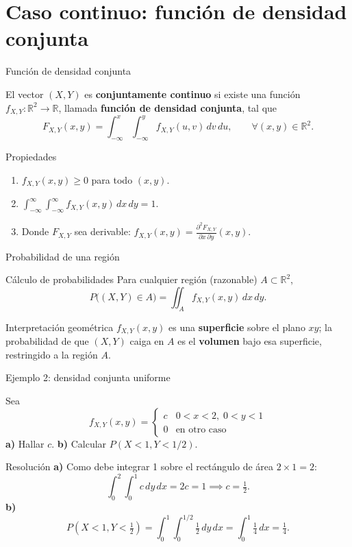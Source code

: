 \documentclass[aspectratio=169,11pt]{beamer}
\begin{document}
\section{Caso continuo: función de densidad conjunta}

\begin{frame}{Función de densidad conjunta}
\begin{definition}
El vector $(X,Y)$ es \textbf{conjuntamente continuo} si existe una función $f_{X,Y}: \mathbb{R}^2 \to \mathbb{R}$, llamada \textbf{función de densidad conjunta}, tal que
\[
F_{X,Y}(x,y) = \int_{-\infty}^{x} \int_{-\infty}^{y} f_{X,Y}(u,v) \, dv \, du, \qquad \forall (x,y) \in \mathbb{R}^2.
\]
\end{definition}
\begin{block}{Propiedades}
\begin{enumerate}
\item $f_{X,Y}(x,y) \ge 0$ para todo $(x,y)$.
\item $\displaystyle\int_{-\infty}^{\infty}\int_{-\infty}^{\infty} f_{X,Y}(x,y)\, dx\, dy = 1$.
\item Donde $F_{X,Y}$ sea derivable: $\displaystyle f_{X,Y}(x,y) = \frac{\partial^2 F_{X,Y}}{\partial x \, \partial y}(x,y)$.
\end{enumerate}
\end{block}
\end{frame}

\begin{frame}{Probabilidad de una región}
\begin{block}{Cálculo de probabilidades}
Para cualquier región (razonable) $A \subset \mathbb{R}^2$,
\[
P\big((X,Y) \in A\big) = \iint_{A} f_{X,Y}(x,y)\, dx\, dy.
\]
\end{block}
\pause
\begin{alertblock}{Interpretación geométrica}
$f_{X,Y}(x,y)$ es una \textbf{superficie} sobre el plano $xy$; la probabilidad de que $(X,Y)$ caiga en $A$ es el \textbf{volumen} bajo esa superficie, restringido a la región $A$.
\end{alertblock}
\end{frame}

\begin{frame}{Ejemplo 2: densidad conjunta uniforme}
\begin{example}
Sea
\[
f_{X,Y}(x,y) = \begin{cases} c & 0 < x < 2, \; 0 < y < 1 \\ 0 & \text{en otro caso} \end{cases}
\]
\textbf{a)} Hallar $c$. \quad \textbf{b)} Calcular $P(X < 1, Y < 1/2)$.
\end{example}
\pause
\begin{block}{Resolución}
\textbf{a)} Como debe integrar 1 sobre el rectángulo de área $2\times 1 = 2$:
\[
\int_0^2 \int_0^1 c \, dy\, dx = 2c = 1 \implies c = \tfrac{1}{2}.
\]
\textbf{b)}
\[
P(X<1, Y<\tfrac12) = \int_0^1 \int_0^{1/2} \tfrac12 \, dy \, dx = \int_0^1 \tfrac14\, dx = \tfrac14.
\]
\end{block}
\end{frame}
\end{document}
